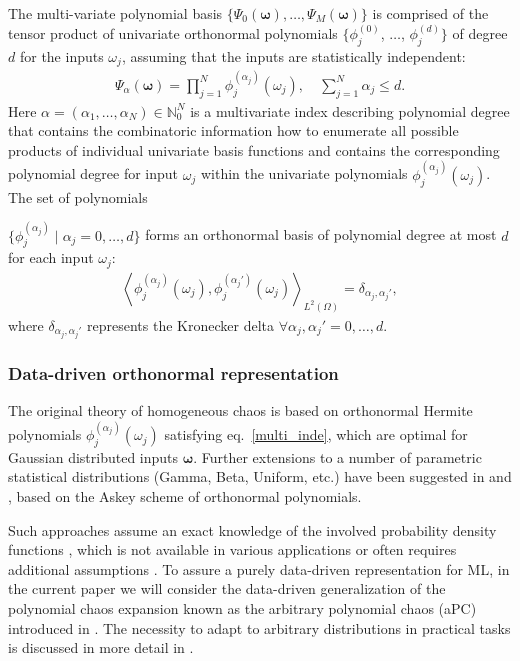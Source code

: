 \documentclass[a4paper,fleqn]{article}
\newcommand{\rw}[1]{\textcolor{blue}{#1}}
\newcommand{\del}[1]{\textcolor{red}{\sout{#1}}}
\renewcommand{\del}[1]{}
\renewcommand{\rw}[1]{#1}
\begin{document}
The multi-variate polynomial basis $\big\{ \Psi_0(\bm{\omega}),\ldots, \Psi_M(\bm{\omega})\big\}$ is comprised of the tensor product of univariate orthonormal polynomials $\big\{\phi^{(0)}_j$, $\ldots$, $\phi^{(d)}_j \big\}$ of degree $d$ for the inputs $\omega_j$, assuming that the inputs are statistically independent:
%
\begin{eqnarray}
\label{basis_multi}
\Psi_{\alpha}(\bm{\omega})=\prod^N_{j=1} \phi^{(\alpha_j)}_j(\omega_j), \quad \sum^N_{j=1} \alpha_j \leq d.
\end{eqnarray}
%
Here $\alpha\rw{=(\alpha_1,\ldots,\alpha_N)\in\mathbb{N}^N_0}$ is a multivariate index \rw{describing polynomial degree} that contains the combinatoric information how to enumerate all possible products of individual univariate basis functions and contains the corresponding polynomial degree for input $\omega_j$ within the univariate polynomials $\phi^{(\alpha_j)}_j(\omega_j)$. The set of polynomials 
\del{$\big\{\phi^{(0)}_j$, $\ldots$, $\phi^{(d)}_j \big\}$}
\rw{$\big\{\phi^{(\alpha_j)}_j\mid \alpha_j=0, \ldots, d \big\}$}
forms an orthonormal basis of polynomial degree \rw{at most} $d$ for each input $\omega_j$:
%
\begin{eqnarray}
\label{multi_inde}
\left\langle \phi^{\del{p}\rw{(\alpha_j)}}_{j}(\omega_j), \phi^{\del{q}\rw{(\alpha_j')}}_j(\omega_j) \right\rangle_{L^2(\Omega)}= \delta_{\del{p,q}\rw{\alpha_j,\alpha_j'}},
\end{eqnarray}
%
where $\delta_{\del{p,q}\rw{\alpha_j,\alpha_j'}}$ represents the Kronecker delta $\forall \del{p,q}\rw{\alpha_j,\alpha_j'} =0,\ldots,d$.

\subsubsection{Data-driven orthonormal representation}
\label{ML_aPC_datadriven}
The original theory of homogeneous chaos \cite{Wiener1938} is based on orthonormal Hermite polynomials  
$\phi^{(\alpha_j)}_j(\omega_j)$ satisfying eq.~\eqref{multi_inde}, which are optimal \cite{OladNowak_RESS2012,MR3364576} for Gaussian distributed inputs $\bm{\omega}$. Further extensions to a  number of parametric statistical distributions (Gamma, Beta, Uniform, etc.) have been suggested in \cite{Xiu2002} and \cite{Xiu2003}, based on the Askey scheme \cite{Askey1985} of \rw{orthonormal} polynomials. 

Such approaches assume an exact knowledge of the involved probability density functions \cite{MR3364576}, which is not available in various applications or often requires additional assumptions \cite{RedHorse2004}\del{)}. To assure a purely data-driven representation for ML, in the current paper we will consider the data-driven generalization of the polynomial chaos expansion known as the arbitrary polynomial chaos (aPC) introduced in \cite{OladNowak_RESS2012}.  The necessity to adapt to arbitrary distributions in practical tasks is discussed in more detail in \cite{OladNowak_AWR2010}. 
\end{document}
